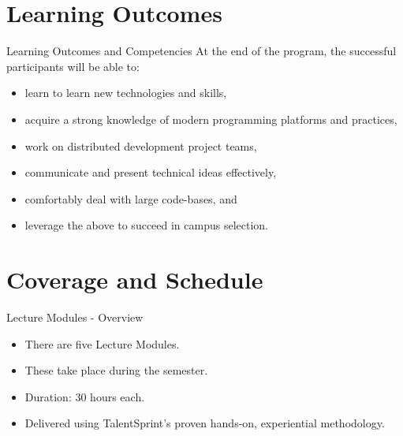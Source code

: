 \documentclass[12pt]{beamer}
\begin{document}
{\section{Learning Outcomes}
\begin{frame}{Learning Outcomes and Competencies}
  At the end of the program, the successful participants will be able to:
  \begin{itemize}
  \item learn to learn new technologies and skills,
  \item acquire a strong knowledge of modern programming platforms and practices, 
  \item work on distributed development project teams,
  \item communicate and present technical ideas effectively,
  \item comfortably deal with large code-bases, and
  \item leverage the above to succeed in campus selection.
  \end{itemize}
\end{frame}

\section{Coverage and Schedule}
\begin{frame}{Lecture Modules - Overview}
    \begin{itemize}
    \item There are five Lecture Modules.
    \item These take place during the semester.
    \item Duration: 30 hours each. 
    \item Delivered using TalentSprint's proven hands-on, experiential methodology.
    \end{itemize}
\end{frame}

}
\end{document}
